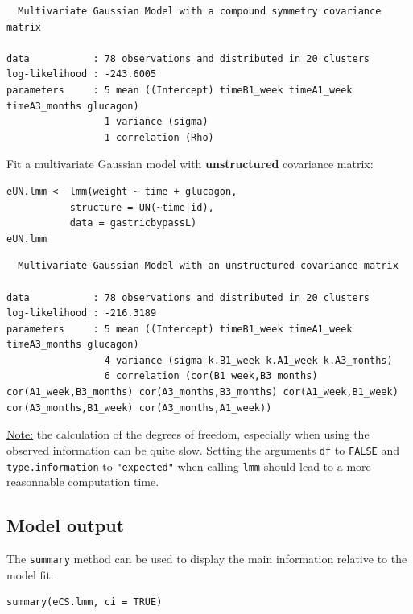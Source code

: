 \documentclass[12pt]{article}
\begin{document}
\begin{verbatim}
  Multivariate Gaussian Model with a compound symmetry covariance matrix 
 
data           : 78 observations and distributed in 20 clusters 
log-likelihood : -243.6005
parameters     : 5 mean ((Intercept) timeB1_week timeA1_week timeA3_months glucagon) 
                 1 variance (sigma) 
                 1 correlation (Rho)
\end{verbatim}



\noindent Fit a multivariate Gaussian model with \textbf{unstructured} covariance matrix:
\lstset{language=r,label= ,caption= ,captionpos=b,numbers=none}
\begin{lstlisting}
eUN.lmm <- lmm(weight ~ time + glucagon,
	       structure = UN(~time|id),
	       data = gastricbypassL)
eUN.lmm
\end{lstlisting}

\begin{verbatim}
  Multivariate Gaussian Model with an unstructured covariance matrix 
 
data           : 78 observations and distributed in 20 clusters 
log-likelihood : -216.3189
parameters     : 5 mean ((Intercept) timeB1_week timeA1_week timeA3_months glucagon) 
                 4 variance (sigma k.B1_week k.A1_week k.A3_months) 
                 6 correlation (cor(B1_week,B3_months) cor(A1_week,B3_months) cor(A3_months,B3_months) cor(A1_week,B1_week) cor(A3_months,B1_week) cor(A3_months,A1_week))
\end{verbatim}


\uline{Note:} the calculation of the degrees of freedom, especially when
using the observed information can be quite slow. Setting the
arguments \texttt{df} to \texttt{FALSE} and \texttt{type.information} to \texttt{"expected"} when
calling \texttt{lmm} should lead to a more reasonnable computation time.

\clearpage

\subsection{Model output}
\label{sec:org4acedcc}

The \texttt{summary} method can be used to display the main information
relative to the model fit:
\lstset{language=r,label= ,caption= ,captionpos=b,numbers=none}
\begin{lstlisting}
summary(eCS.lmm, ci = TRUE)
\end{lstlisting}
\end{document}
